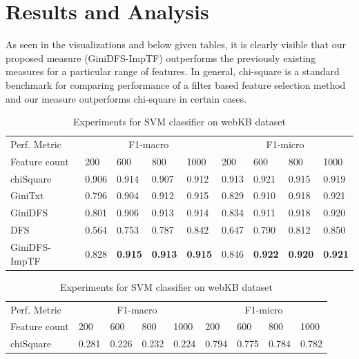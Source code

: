 \documentclass[a4paper, 14pt]{article}
\begin{document}
\section{Results and Analysis}
\begin{justify}

As seen in the visualizations and below given tables, it is clearly visible that our proposed measure (GiniDFS-ImpTF) outperforms the previously existing measures for a particular range of features. In general, chi-square is a standard benchmark for comparing performance of a filter based feature selection method and our measure outperforms chi-square in certain cases.


\begin{table}[h!]
\begin{tabular}{l|llll|llll}
\toprule 
    Perf. Metric & \multicolumn{4}{c}{F1-macro} & \multicolumn{4}{c}{F1-micro}  \\


    Feature count & 200  & 600 & 800 & 1000 & 
     200  & 600 & 800 & 1000  \\
    
    \midrule
    chiSquare &0.906  & 0.914 & 0.907 & 0.912 & 0.913  & 0.921 & 0.915 & 0.919 \\
    GiniTxt &0.796  & 0.904 & 0.912 & 0.915 &0.829  & 0.910 & 0.918 & 0.921 \\
    GiniDFS &0.801  & 0.906 & 0.913 & 0.914 & 0.834  & 0.911 & 0.918 & 0.920 \\
    DFS & 0.564  & 0.753 & 0.787 & 0.842 & 0.647  & 0.790 & 0.812 & 0.850  \\
    GiniDFS-ImpTF & 0.828  & \textbf{0.915} & \textbf{0.913} & \textbf{0.915} & 0.846 &  \textbf{0.922} & \textbf{0.920} & \textbf{0.921} \\
   
    
    \bottomrule
\end{tabular}
\caption{Experiments for SVM classifier on webKB dataset}\label{table:somename}


\vspace{15}


\begin{tabular}{l|llll|llll}
\toprule 
    Perf. Metric & \multicolumn{4}{c}{F1-macro} & \multicolumn{4}{c}{F1-micro}  \\


    Feature count & 200 &  600 & 800 & 1000 & 
     200 &  600 & 800 & 1000  \\
    
    \midrule
    chiSquare &0.281  & 0.226 & 0.232 & 0.224 &  0.794 & 0.775 & 0.784 & 0.782 \\


\end{tabular}
\end{table}
\end{justify}
\end{document}

